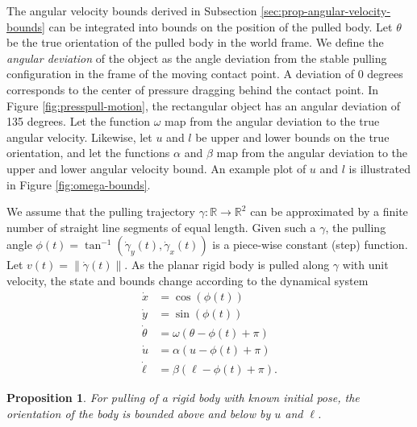 \documentclass[conference]{IEEEtran}
\newtheorem{proposition}{Proposition}
\begin{document}
The angular velocity bounds derived in Subsection
\ref{sec:prop-angular-velocity-bounds} can be integrated into bounds
on the position of the pulled body.  Let $\theta$ be the true
orientation of the pulled body in the world frame.  We define the
\textit{angular deviation} of the object as the angle deviation from
the stable pulling configuration in the frame of the moving contact
point. A deviation of 0 degrees corresponds to the center of pressure
dragging behind the contact point. In Figure
\ref{fig:presspull-motion}, the rectangular object has an angular
deviation of 135 degrees. Let the function $\omega$ map from the
angular deviation to the true angular velocity. Likewise, let $u$ and
$l$ be upper and lower bounds on the true orientation, and let the
functions $\alpha$ and $\beta$ map from the angular deviation to the
upper and lower angular velocity bound. An example plot of $u$ and $l$
is illustrated in Figure \ref{fig:omega-bounds}.

We assume that the pulling trajectory
$\gamma:\mathbb{R}\rightarrow\mathbb{R}^2$ can be approximated by a
finite number of straight line segments of equal length. Given such a
$\gamma$, the pulling angle
$\phi(t) = \tan^{-1}(\dot{\gamma}_y(t),\dot{\gamma}_x(t))$ is a
piece-wise constant (step) function. Let
$v(t) = \lVert\dot{\gamma}(t)\rVert$. As the planar rigid body is
pulled along $\gamma$ with unit velocity, the state and bounds change
according to the dynamical system
\begin{align}
  \dot{x} &= \cos(\phi(t))\\
  \dot{y} &= \sin(\phi(t))\\
  \dot{\theta} &= \omega(\theta - \phi(t) + \pi)\\
  \dot{u} &=  \alpha(u - \phi(t) + \pi) \label{eq:u-ode}\\ 
  \dot{\ell} &=  \beta(\ell - \phi(t) + \pi). 
\end{align}

\begin{proposition}\label{prop:orientation-bounds}
  For pulling of a rigid body with known initial pose, the orientation
  of the body is bounded above and below by $u$ and $\ell$.
\end{proposition}
\end{document}
